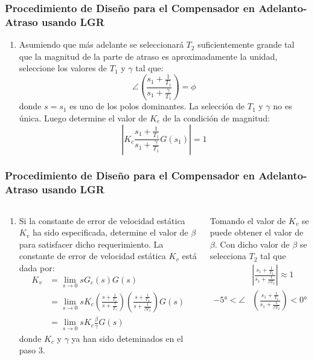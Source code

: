 \documentclass[aspectratio=169,handout]{beamer}
\theoremstyle{definition}
\theoremstyle{plain}
\theoremstyle{remark}
\newcounter{saveenumi}
\newcommand{\seti}{\setcounter{saveenumi}{\value{enumi}}}
\newcommand{\conti}{\setcounter{enumi}{\value{saveenumi}}}
\begin{document}
\begin{frame}[<+->]\frametitle{Procedimiento de Diseño para el Compensador en Adelanto-Atraso usando LGR}
\small
	\begin{enumerate}
		\conti
		\item Asumiendo que más adelante se seleccionará $T_2$ suficientemente grande tal que la magnitud de la parte de atraso es aproximadamente la unidad, seleccione los valores de $T_1$ y $\gamma$ tal que:
		\begin{equation*}
			\angle\left(\frac{s_1+\frac{1}{T_1}}{s_1+\frac{\gamma}{T_1}} \right) = \phi
		\end{equation*}
		donde $s = s_1$ es uno de los polos dominantes. La selección de $T_1$ y $\gamma$ no es única.
		\pause
		Luego determine el valor de $K_c$ de la condición de magnitud:
		\begin{equation*}
			\left| K_c \frac{s_1+\frac{1}{T_1}}{s_1+\frac{\gamma}{T_1}} G(s_1) \right| = 1
		\end{equation*}
		\seti
	\end{enumerate}
\end{frame}

\begin{frame}[<+->]\frametitle{Procedimiento de Diseño para el Compensador en Adelanto-Atraso usando LGR}
\small
\begin{columns}
	\begin{column}{0.6\textwidth}
	\begin{enumerate}
		\conti
		\item Si la constante de error de velocidad estática $K_v$ ha sido especificada, determine el valor de $\beta$ para satisfacer dicho requerimiento.
		\pause
		La constante de error de velocidad estática $K_v$ está dada por:
		\begin{align*}
			K_v &= \lim_{s \rightarrow 0} s G_c(s)G(s)\\
			&= \lim_{s \rightarrow 0} s K_c \left( \frac{s+\frac{1}{T_1}}{s+\frac{\gamma}{T_1}} \right)\left( \frac{s+\frac{1}{T_2}}{s+\frac{1}{\beta T_2}} \right) G(s)\\
			&= \lim_{s \rightarrow 0} s K_c \frac{\beta}{\gamma} G(s)
		\end{align*}
		donde $K_c$ y $\gamma$ ya han sido deteminados en el paso 3. 
	\end{enumerate}
	\end{column}
	\begin{column}{0.4\textwidth}
	\pause
	Tomando el valor de $K_v$ se puede obtener el valor de $\beta$. Con dicho valor de $\beta$ se selecciona $T_2$ tal que
	\begin{align*}
		&\left| \frac{s_1+\frac{1}{T_2}}{s_1+\frac{1}{\beta T_2}} \right| \approx 1\\
		-\ang{5} < \angle&\left( \frac{s_1+\frac{1}{T_2}}{s_1+\frac{1}{\beta T_2}} \right) < \ang{0}
	\end{align*}
	\end{column}
\end{columns}
\end{frame}
\end{document}
